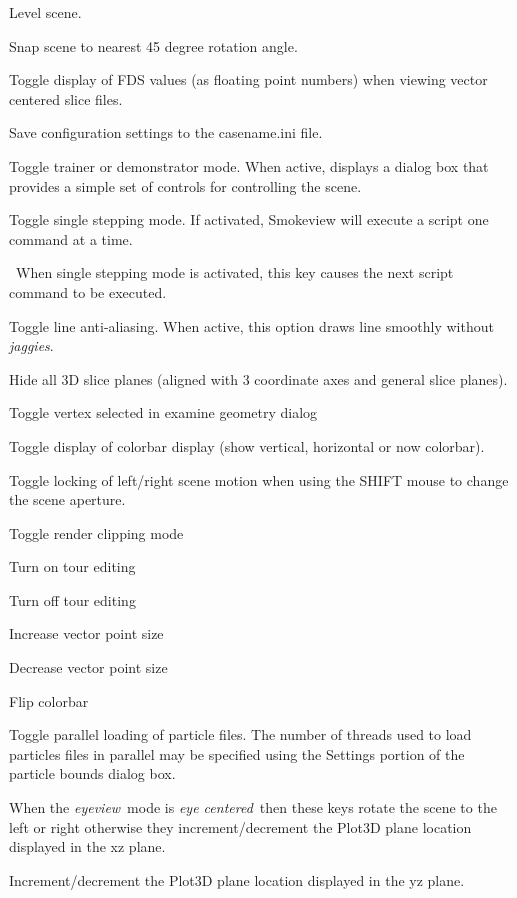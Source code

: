 \documentclass[11pt,twoside]{book}
\newcommand{\kitem}[1]{\item[{\bf {\tt #1 \  }} \hfill]}
\newcommand{\hitem}[1]{\item[{\bf #1} \hfill]}
\begin{document}
\kitem{\~}Level scene.

\kitem{!}Snap scene to nearest 45 degree rotation angle.

\kitem{@}Toggle display of FDS values (as floating point numbers)
when viewing vector centered slice files.

\kitem{\#}Save configuration settings to the casename.ini file.

\kitem{\$}Toggle trainer or demonstrator mode.  When active,
displays a dialog box that provides a simple set of controls for
controlling the scene.

\kitem{\%}Toggle single stepping mode.  If activated, Smokeview
will execute a script one command at a time.

\kitem{\^ \ }\ When single stepping mode is activated, this key
causes the next script command to be executed.

\kitem{\&}Toggle line anti-aliasing.  When active, this option
draws line smoothly without {\em jaggies}.

\kitem{*}Hide all 3D slice planes (aligned with 3 coordinate axes
and general slice planes).

\kitem{=}Toggle vertex selected in examine geometry dialog

\kitem{,}Toggle display of colorbar display (show vertical, horizontal or now colorbar).

\kitem{.}Toggle locking of left/right scene motion when using the SHIFT mouse to change the scene aperture.

\kitem{(}Toggle render clipping mode

\kitem{[}Turn on tour editing

\kitem{]}Turn off tour editing

\kitem{<}Increase vector point size

\kitem{>}Decrease vector point size

\kitem{;}Flip colorbar

\kitem{/}Toggle parallel loading of particle files.  The number of threads used to load
particles files in parallel may be specified using the Settings portion of the particle bounds
dialog box.

\hitem{Left/Right Cursor}When the {\em eyeview}\ mode is {\em eye
centered}\ then these keys rotate the scene to the left or right
otherwise they increment/decrement the Plot3D plane location
displayed in the xz plane.

\hitem{Up/Down Cursor}Increment/decrement the Plot3D plane
location displayed in the yz plane.
\end{document}
